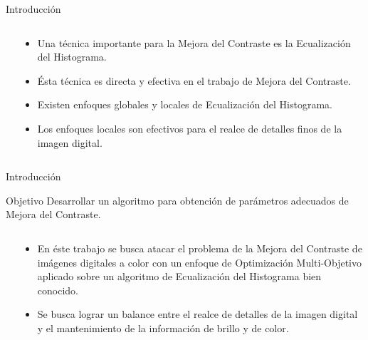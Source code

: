 \documentclass[usenames,dvipsnames]{beamer}
\begin{document}
\begin{frame}{Introducción}

\begin{columns}[t]
\begin{column}{.3\textwidth}

\end{column}
\begin{column}{.7\textwidth}
\begin{itemize}
	\item Una técnica importante para la Mejora del Contraste es la Ecualización del Histograma.
	\item Ésta técnica es directa y efectiva en el trabajo de Mejora del Contraste.
	\item Existen enfoques globales y locales de Ecualización del Histograma.
	\item Los enfoques locales son efectivos para el realce de detalles finos de la imagen digital.
\end{itemize}
\end{column}
\end{columns}


\end{frame}


\begin{frame}{Introducción}
\vspace{-0.5cm}
\begin{alertblock}{Objetivo}
Desarrollar un algoritmo para obtención de parámetros adecuados de Mejora del Contraste.
\end{alertblock}
\vspace{-0.2cm}
\begin{columns}[t]
\begin{column}{.3\textwidth}

\end{column}
\begin{column}{.7\textwidth}
\begin{itemize}
	\item En éste trabajo se busca atacar el problema de la Mejora del Contraste de imágenes digitales a color con un enfoque de Optimización Multi-Objetivo aplicado sobre un algoritmo de Ecualización del Histograma bien conocido.
	\item Se busca lograr un balance entre el realce de detalles de la imagen digital y el mantenimiento de la información de brillo y de color.
\end{itemize}
\end{column}
\end{columns}


\end{frame}
\end{document}
